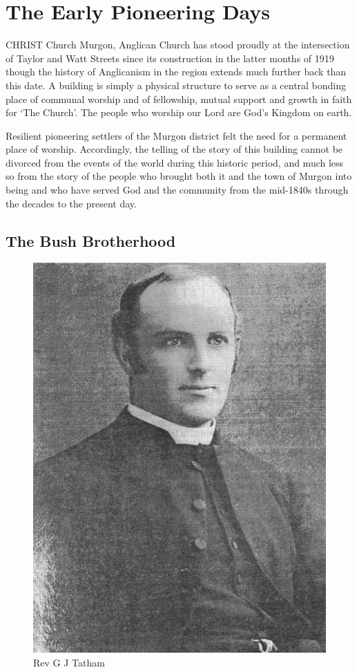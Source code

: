 

\chapter{The Early Pioneering Days}
\nobalance


\lettrine[lines=3]{C}{HRIST}
 Church Murgon, Anglican Church has stood proudly at the intersection of Taylor and Watt Streets since its construction in the latter months of 1919 though the history of Anglicanism in the region extends much further back than this date. A building is simply a physical structure to serve as a central bonding place of communal worship and of fellowship, mutual support and growth in faith for `The Church'. The people who worship our Lord are God's Kingdom on earth.

Resilient pioneering settlers of the Murgon district felt the need for a permanent place of worship. Accordingly, the telling of the story of this building cannot be divorced from the events of the world during this historic period, and much less so from the story of the people who brought both it and the town of Murgon into being and who have served God and the community from the mid-1840s through the decades to the present day.



\section{The Bush Brotherhood}









\begin{figure}
\begin{center}
\includegraphics[width=.5\linewidth,center]{../images/RGTatham.jpg}
\caption{Rev G J Tatham}
\end{center}
\end{figure}




